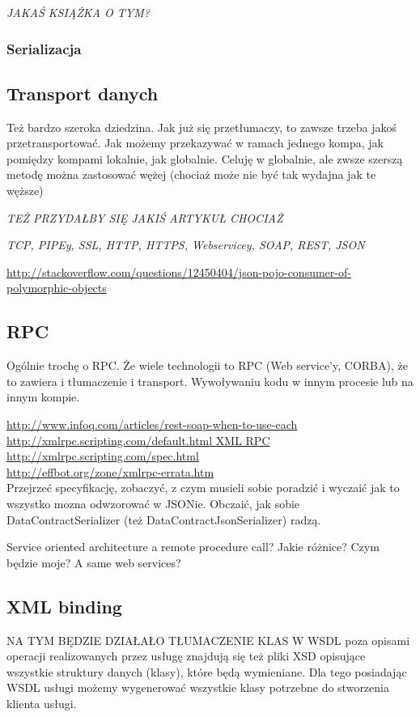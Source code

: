 \emph{JAKAŚ KSIĄŻKA O TYM?}

\subsubsection{Serializacja}

\subsection{Transport danych}
Też bardzo szeroka dziedzina. Jak już się przetłumaczy, to zawsze trzeba jakoś przetransportować. Jak możemy przekazywać w ramach jednego kompa, jak pomiędzy kompami lokalnie, jak globalnie.
Celuję w globalnie, ale zwsze szerszą metodę można zastosować wężej (chociaż może nie być tak wydajna jak te węższe)

\emph{TEŻ PRZYDAŁBY SIĘ JAKIŚ ARTYKUŁ CHOCIAŻ}

\emph{TCP, PIPEy, SSL, HTTP, HTTPS, Webservicey, SOAP, REST, JSON}

\url{http://stackoverflow.com/questions/12450404/json-pojo-consumer-of-polymorphic-objects}

\subsection{RPC}
Ogólnie trochę o RPC. Że wiele technologii to RPC (Web service'y, CORBA), że to zawiera i tłumaczenie i transport.
Wywoływaniu kodu w innym procesie lub na innym kompie.

\url{http://www.infoq.com/articles/rest-soap-when-to-use-each}\\

\url{http://xmlrpc.scripting.com/default.html XML RPC}\\
\url{http://xmlrpc.scripting.com/spec.html}\\
\url{http://effbot.org/zone/xmlrpc-errata.htm}\\
Przejrzeć specyfikację, zobaczyć, z czym musieli sobie poradzić i wyczaić jak to wszystko mozna odwzorować w JSONie. Obczaić, jak sobie DataContractSerializer (też DataContractJsonSerializer) radzą. 

Service oriented architecture a remote procedure call? Jakie różnice? Czym będzie moje? A same web services?

\subsection{XML binding}
NA TYM BĘDZIE DZIAŁAŁO TŁUMACZENIE KLAS
W WSDL poza opisami operacji realizowanych przez usługę znajdują się też pliki XSD opisujące wszystkie struktury danych (klasy), które będą wymieniane. Dla tego posiadając WSDL usługi możemy wygenerować wszystkie klasy potrzebne do stworzenia klienta usługi.

